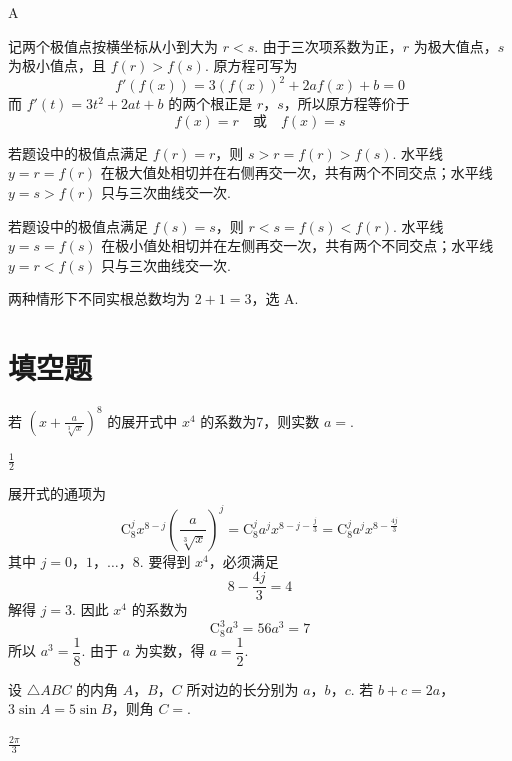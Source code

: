\begin{answer}
A
\end{answer}

\begin{solution}
记两个极值点按横坐标从小到大为 \(r<s\). 由于三次项系数为正，\(r\) 为极大值点，\(s\) 为极小值点，且 \(f(r)>f(s)\). 原方程可写为
\[
f'(f(x))=3(f(x))^2+2af(x)+b=0
\]
而 \(f'(t)=3t^2+2at+b\) 的两个根正是 \(r\)，\(s\)，所以原方程等价于
\[
f(x)=r\quad\text{或}\quad f(x)=s
\]

若题设中的极值点满足 \(f(r)=r\)，则 \(s>r=f(r)>f(s)\). 水平线 \(y=r=f(r)\) 在极大值处相切并在右侧再交一次，共有两个不同交点；水平线 \(y=s>f(r)\) 只与三次曲线交一次.

若题设中的极值点满足 \(f(s)=s\)，则 \(r<s=f(s)<f(r)\). 水平线 \(y=s=f(s)\) 在极小值处相切并在左侧再交一次，共有两个不同交点；水平线 \(y=r<f(s)\) 只与三次曲线交一次.

两种情形下不同实根总数均为 \(2+1=3\)，选 A.
\end{solution}

\section{填空题}

\begin{problem}
若 \(\left(x + \frac{a}{\sqrt[3]{x}}\right)^8\) 的展开式中 \(x^4\) 的系数为7，则实数 \(a = \)\fillinblank{}.
\end{problem}

\begin{answer}
\(\frac{1}{2}\)
\end{answer}

\begin{solution}
展开式的通项为
\[
\mathrm C_8^j x^{8-j}\left(\frac{a}{\sqrt[3]{x}}\right)^j
=\mathrm C_8^j a^j x^{8-j-\frac j3}
=\mathrm C_8^j a^j x^{8-\frac{4j}{3}}
\]
其中 \(j=0\)，\(1\)，\(\ldots\)，\(8\). 要得到 \(x^4\)，必须满足
\[
8-\frac{4j}{3}=4
\]
解得 \(j=3\). 因此 \(x^4\) 的系数为
\[
\mathrm C_8^3a^3=56a^3=7
\]
所以 \(a^3=\dfrac18\). 由于 \(a\) 为实数，得 \(a=\dfrac12\).
\end{solution}

\begin{problem}
设 \(\triangle ABC\) 的内角 \(A\)，\(B\)，\(C\) 所对边的长分别为 \(a\)，\(b\)，\(c\). 若 \(b + c = 2a\)，\(3\sin A = 5\sin B\)，则角 \(C = \)\fillinblank{}.
\end{problem}

\begin{answer}
\(\frac{2\pi}{3}\)
\end{answer}

